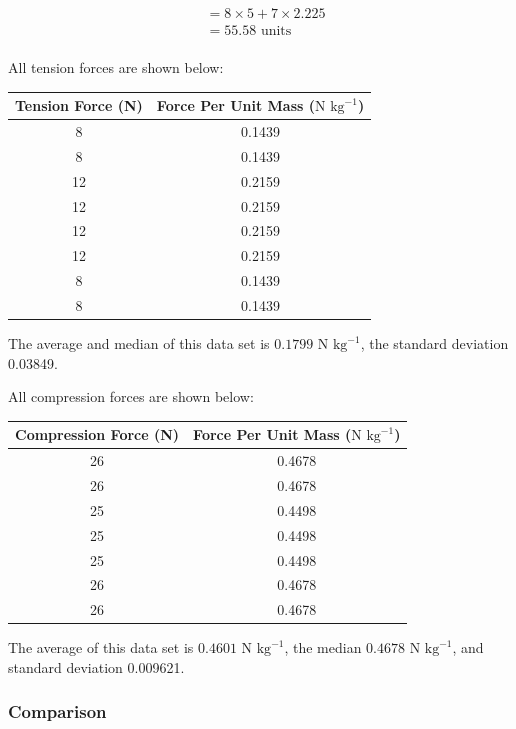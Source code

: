 \documentclass[a4paper,11pt]{article}
\begin{document}
$$
\begin{aligned}
& = 8 \times 5 + 7 \times 2.225 \\
& = 55.58\mbox{ units} \\
\end{aligned}
$$

All tension forces are shown below:

\begin{center}
\begin{tabular}{|c|c|}
\hline
Tension Force (N) & Force Per Unit Mass ($\mbox{N kg}^{-1}$) \\
\hline
8 & 0.1439 \\
8 & 0.1439 \\
12 & 0.2159 \\
12 & 0.2159 \\
12 & 0.2159 \\
12 & 0.2159 \\
8 & 0.1439 \\
8 & 0.1439 \\
\hline
\end{tabular}
\end{center}

The average and median of this data set is $0.1799\mbox{ N kg}^{-1}$, the
standard deviation 0.03849.

All compression forces are shown below:

\begin{center}
\begin{tabular}{|c|c|}
\hline
Compression Force (N) & Force Per Unit Mass ($\mbox{N kg}^{-1}$) \\
\hline
26 & 0.4678 \\
26 & 0.4678 \\
25 & 0.4498 \\
25 & 0.4498 \\
25 & 0.4498 \\
26 & 0.4678 \\
26 & 0.4678 \\
\hline
\end{tabular}
\end{center}

The average of this data set is $0.4601\mbox{ N kg}^{-1}$, the median
$0.4678\mbox{ N kg}^{-1}$, and standard deviation 0.009621.


\subsubsection{Comparison}
\end{document}

